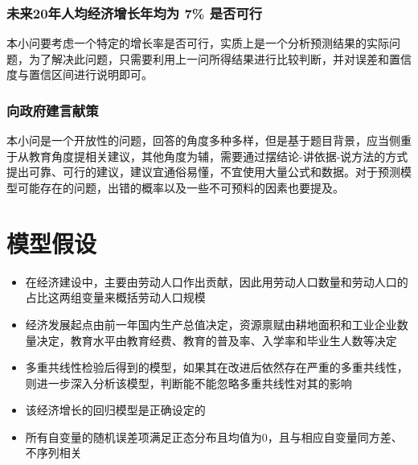 \documentclass[UTF8]{article}
\begin{document}
		\subsubsection{未来20年人均经济增长年均为 7\% 是否可行}
		本小问要考虑一个特定的增长率是否可行，实质上是一个分析预测结果的实际问题，为了解决此问题，只需要利用上一问所得结果进行比较判断，并对误差和置信度与置信区间进行说明即可。
		\subsubsection{向政府建言献策}
		本小问是一个开放性的问题，回答的角度多种多样，但是基于题目背景，应当侧重于从教育角度提相关建议，其他角度为辅，需要通过摆结论-讲依据-说方法的方式提出可靠、可行的建议，建议宜通俗易懂，不宜使用大量公式和数据。对于预测模型可能存在的问题，出错的概率以及一些不可预料的因素也要提及。
	\section{模型假设}
	\begin{itemize}
		\item 在经济建设中，主要由劳动人口作出贡献，因此用劳动人口数量和劳动人口的占比这两组变量来概括劳动人口规模
		\item 经济发展起点由前一年国内生产总值决定，资源禀赋由耕地面积和工业企业数量决定，教育水平由教育经费、教育的普及率、入学率和毕业生人数等决定
		\item 多重共线性检验后得到的模型，如果其在改进后依然存在严重的多重共线性，则进一步深入分析该模型，判断能不能忽略多重共线性对其的影响
		\item 该经济增长的回归模型是正确设定的
		\item 所有自变量的随机误差项满足正态分布且均值为0，且与相应自变量同方差、不序列相关
	\end{itemize}
\end{document}
